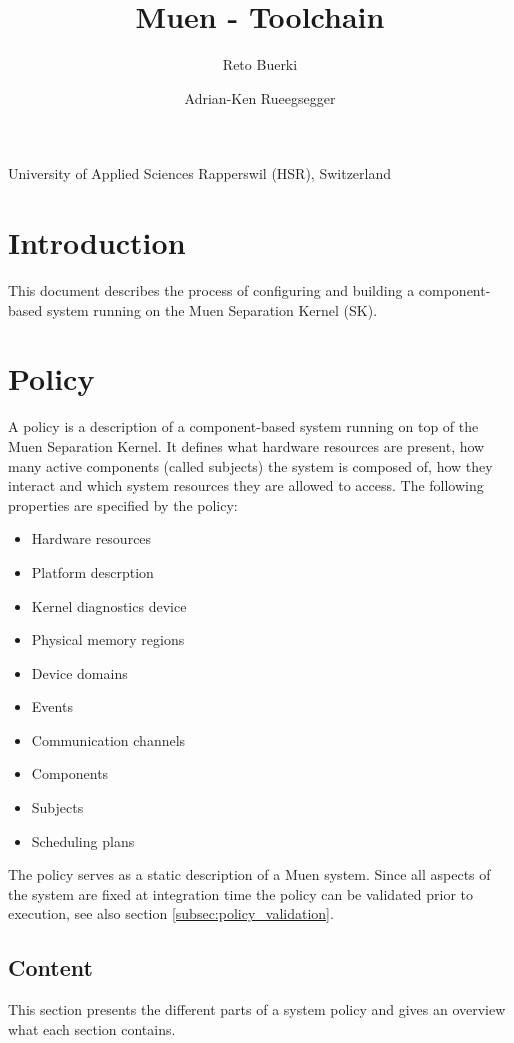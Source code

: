 \documentclass[a4paper,twoside,titlepage]{article}
\title{Muen - Toolchain}
\author{Reto Buerki \and Adrian-Ken Rueegsegger}
\begin{document}


\maketitle

\begin{center}
	University of Applied Sciences Rapperswil (HSR), Switzerland
\end{center}
\clearpage

\tableofcontents
\listoffigures

\section{Introduction}
This document describes the process of configuring and building a
component-based system running on the Muen Separation Kernel (SK).

\section{Policy}
A policy is a description of a component-based system running on top of the Muen
Separation Kernel. It defines what hardware resources are present, how many
active components (called subjects) the system is composed of, how they interact
and which system resources they are allowed to access. The following properties
are specified by the policy:

\begin{itemize}
	\item Hardware resources
	\item Platform descrption
	\item Kernel diagnostics device
	\item Physical memory regions
	\item Device domains
	\item Events
	\item Communication channels
	\item Components
	\item Subjects
	\item Scheduling plans
\end{itemize}

The policy serves as a static description of a Muen system. Since all aspects of
the system are fixed at integration time the policy can be validated prior to
execution, see also section \ref{subsec:policy_validation}.

\subsection{Content}
This section presents the different parts of a system policy and gives an
overview what each section contains.
\end{document}
